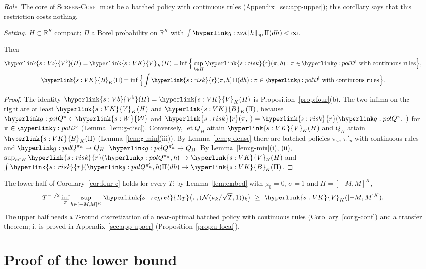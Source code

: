 \documentclass[11pt]{article}
\DeclareRobustCommand{\sy}[2]{{\hyperlink{#1}{#2}}}
\newcommand{\R}{\mathbb{R}}
\newcommand{\1}{\mathbf{1}}
\newcommand{\RT}{\sy{s:regret}{R_T}}
\newcommand{\Wc}{\sy{s:W}{\mathcal W}}
\newcommand{\rk}{\sy{s:risk}{r}}
\newcommand{\VK}{\sy{s:VK}{V}}
\newcommand{\BK}{\sy{s:VK}{B}}
\newcommand{\Vb}{\sy{s:Vb}{V^\flat}}
\newcommand{\SC}{\sy{alg:sc}{\textsc{Screen-Core}}}
\begin{document}
\begin{corollary}\label{cor:g-cont}
\textit{Role.} The core of \SC\ must be a batched policy with continuous rules (Appendix~\ref{sec:app-upper}); this corollary says that this restriction costs nothing.

\noindent\textit{Setting.} $H\subset\R^K$ compact; $\Pi$ a Borel probability on $\R^K$ with $\int\gsp h\,\Pi(dh)<\infty$.

\noindent Then
\begin{gather*}
\Vb(H)=\VK_K(H)=\inf\Big\{\sup_{h\in H}\rk(\pi,h):\pi\in\gBc\text{ with continuous rules}\Big\},\\
\BK_K(\Pi)=\inf\Big\{\int\rk(\pi,h)\,\Pi(dh):\pi\in\gBc\text{ with continuous rules}\Big\}.
\end{gather*}
\end{corollary}
\begin{proof}
The identity $\Vb(H)=\VK_K(H)$ is Proposition~\ref{prop:four}(b). The two infima on the right are at least $\VK_K(H)$ and $\BK_K(\Pi)$, because
$\gQp\pi\in\Wc$ and $\rk(\pi,\cdot)=\rk(\gQp\pi,\cdot)$ for $\pi\in\gBc$ (Lemma~\ref{lem:g-disc}). Conversely, let $Q_H$ attain $\VK_K(H)$ and $Q_\Pi$ attain $\BK_K(\Pi)$ (Lemma~\ref{lem:g-min}(iii)). By
Lemma~\ref{lem:g-dense} there are batched policies $\pi_n$, $\pi'_n$ with continuous rules and $\gQp{\pi_n}\to Q_H$, $\gQp{\pi'_n}\to Q_\Pi$. By Lemma~\ref{lem:g-min}(i), (ii),
$\sup_{h\in H}\rk(\gQp{\pi_n},h)\to\VK_K(H)$ and $\int\rk(\gQp{\pi'_n},h)\Pi(dh)\to\BK_K(\Pi)$.
\end{proof}

\begin{remark}\label{rem:g-c}
The lower half of Corollary~\ref{cor:four-c} holds for every $T$: by Lemma~\ref{lem:embed} with $\mu_0=0$, $\sigma=1$ and $H=[-M,M]^K$,
\[
T^{-1/2}\inf_\pi\sup_{h\in[-M,M]^K}\RT\big(\pi,(\mathcal N(h_k/\sqrt T,1))_k\big)\ \ge\ \VK_K([-M,M]^K).
\]
The upper half needs a $T$-round discretization of a near-optimal batched policy with continuous rules (Corollary~\ref{cor:g-cont}) and a transfer theorem; it is
proved in Appendix~\ref{sec:app-upper} (Proposition~\ref{prop:u-local}).
\end{remark}

\section{Proof of the lower bound}\label{sec:app-lower}
\end{document}
